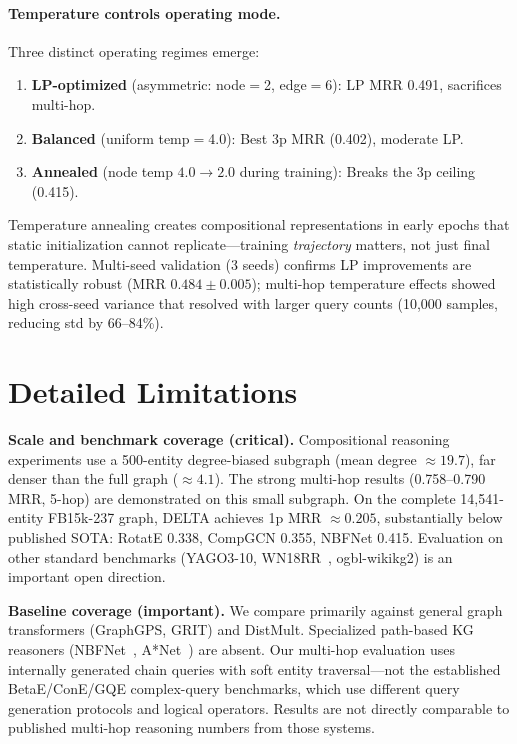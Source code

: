 \documentclass{article}
\begin{document}
\paragraph{Temperature controls operating mode.}
Three distinct operating regimes emerge:
\begin{enumerate}
    \item \textbf{LP-optimized} (asymmetric: node$=$2, edge$=$6): LP MRR 0.491, sacrifices multi-hop.
    \item \textbf{Balanced} (uniform temp$=$4.0): Best 3p MRR (0.402), moderate LP.
    \item \textbf{Annealed} (node temp $4.0 \to 2.0$ during training): Breaks the 3p ceiling (0.415).
\end{enumerate}

Temperature annealing creates compositional representations in early epochs that static initialization cannot replicate---training \emph{trajectory} matters, not just final temperature. Multi-seed validation (3 seeds) confirms LP improvements are statistically robust (MRR $0.484 \pm 0.005$); multi-hop temperature effects showed high cross-seed variance that resolved with larger query counts (10,000 samples, reducing std by 66--84\%).

\section{Detailed Limitations}
\label{app:limitations}

\textbf{Scale and benchmark coverage (critical).}
Compositional reasoning experiments use a 500-entity degree-biased subgraph (mean degree $\approx 19.7$), far denser than the full graph ($\approx 4.1$). The strong multi-hop results (0.758--0.790 MRR, 5-hop) are demonstrated on this small subgraph. On the complete 14,541-entity FB15k-237 graph, DELTA achieves 1p MRR $\approx 0.205$, substantially below published SOTA: RotatE 0.338, CompGCN 0.355, NBFNet 0.415. Evaluation on other standard benchmarks (YAGO3-10, WN18RR~\cite{dettmers2018convolutional}, ogbl-wikikg2) is an important open direction.

\textbf{Baseline coverage (important).}
We compare primarily against general graph transformers (GraphGPS, GRIT) and DistMult. Specialized path-based KG reasoners (NBFNet~\cite{zhu2021neural}, A*Net~\cite{zhu2022astar}) are absent. Our multi-hop evaluation uses internally generated chain queries with soft entity traversal---not the established BetaE/ConE/GQE complex-query benchmarks, which use different query generation protocols and logical operators. Results are not directly comparable to published multi-hop reasoning numbers from those systems.
\end{document}
